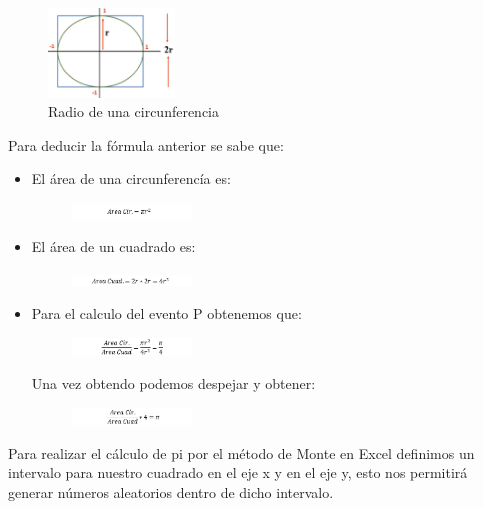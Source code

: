 \documentclass[letterpaper, 10 pt, conference]{ieeeconf}
\begin{document}
 \begin{figure}[!ht]
\centering
\includegraphics[width=0.3\textwidth]{images/fig1.png}
\caption{Radio de una circunferencia}
\label{fig:estructurados}
\end{figure}
Para deducir la fórmula anterior se sabe que:
\begin{itemize}
    \item El área de una circunferencía es:
     \begin{figure}[!ht]
\centering
\includegraphics[width=0.3\textwidth]{images/ecu1.png}
\label{fig:estructurados}
\end{figure}
\item El área de un cuadrado es:
 \begin{figure}[!ht]
\centering
\includegraphics[width=0.3\textwidth]{images/ecu2.png}
\label{fig:estructurados}
\end{figure}
\item Para el calculo del evento P obtenemos que:
 \begin{figure}[!ht]
\centering
\includegraphics[width=0.3\textwidth]{images/ecu3.png}
\label{fig:estructurados}
\end{figure}
\newline
Una vez obtendo podemos despejar y obtener:
 \begin{figure}[!ht]
\centering
\includegraphics[width=0.3\textwidth]{images/ecu4.png}
\label{fig:estructurados}
\end{figure}
\end{itemize}
Para realizar el cálculo de pi por el método de Monte en Excel definimos un intervalo para nuestro cuadrado en el eje x y en el eje y, esto nos permitirá generar números aleatorios dentro de dicho intervalo.
\end{document}
